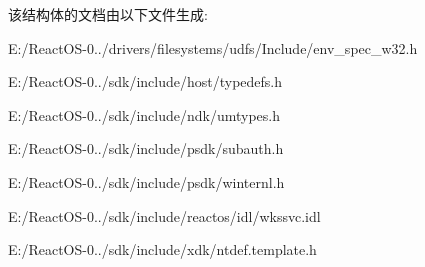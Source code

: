 该结构体的文档由以下文件生成\+:\begin{DoxyCompactItemize}
\item 
E\+:/\+React\+O\+S-\/0../drivers/filesystems/udfs/\+Include/env\+\_\+spec\+\_\+w32.\+h\item 
E\+:/\+React\+O\+S-\/0../sdk/include/host/typedefs.\+h\item 
E\+:/\+React\+O\+S-\/0../sdk/include/ndk/umtypes.\+h\item 
E\+:/\+React\+O\+S-\/0../sdk/include/psdk/subauth.\+h\item 
E\+:/\+React\+O\+S-\/0../sdk/include/psdk/winternl.\+h\item 
E\+:/\+React\+O\+S-\/0../sdk/include/reactos/idl/wkssvc.\+idl\item 
E\+:/\+React\+O\+S-\/0../sdk/include/xdk/ntdef.\+template.\+h\end{DoxyCompactItemize}
